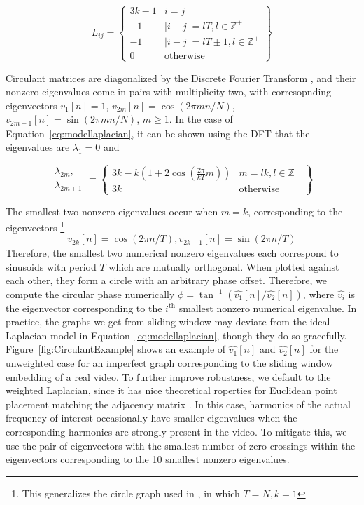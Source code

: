 \documentclass{article}
\begin{document}
\begin{equation}
\label{eq:modellaplacian}
L_{ij} = \left\{ \begin{array}{cc} 3k-1 & i = j \\ -1 & |i-j| = lT, l \in \mathbb{Z}^+ \\ -1 & |i-j| = lT \pm 1, l \in \mathbb{Z}^+ \\ 0 & \text{otherwise} \end{array} \right\}
\end{equation}

Circulant matrices are diagonalized by the Discrete Fourier Transform \cite{godsil2013algebraic}, and their nonzero eigenvalues come in pairs with multiplicity two, with corresopnding eigenvectors $v_1[n] = 1$, $v_{2m}[n] = \cos(2 \pi mn / N)$, $v_{2m+1}[n] = \sin(2 \pi m n / N)$, $m \geq 1$.  In the case of Equation~\ref{eq:modellaplacian}, it can be shown using the DFT that the eigenvalues are $\lambda_1 = 0$ and 

\begin{equation}
\begin{array}{cc}\lambda_{2m},\\\lambda_{2m+1}\end{array} = \left\{ \begin{array}{cc} 3k - k\left( 1 + 2 \cos \left( \frac{2 \pi}{kT} m \right) \right) & m = lk, l \in \mathbb{Z}^+ \\ 3k & \text{otherwise}  \end{array} \right\} 
\end{equation}

The smallest two nonzero eigenvalues occur when $m = k$, corresponding to the eigenvectors \footnote{This generalizes the circle graph used in \cite{averbuch2015ringit}, in which $T = N, k = 1$} 
\begin{equation}
v_{2k}[n] = \cos(2 \pi n / T), v_{2k+1}[n] = \sin(2 \pi n / T)
\end{equation}
Therefore, the smallest two numerical nonzero eigenvalues each correspond to sinusoids with period $T$ which are mutually orthogonal.  When plotted against each other, they form a circle with an arbitrary phase offset.  Therefore, we compute the circular phase numerically $\phi = \tan^{-1}(\hat{v_1}[n] / \hat{v_2}[n])$, where $\hat{v_i}$ is the eigenvector corresponding to the $i^\text{th}$ smallest nonzero numerical eigenvalue.  In practice, the graphs we get from sliding window may deviate from the ideal Laplacian model in Equation~\ref{eq:modellaplacian}, though they do so gracefully.  Figure~\ref{fig:CirculantExample} shows an example of $\hat{v_1}[n]$ and $\hat{v_2}[n]$ for the unweighted case for an imperfect graph corresponding to the sliding window embedding of a real video.  To further improve robustness, we default to the weighted Laplacian, since it has nice theoretical roperties for Euclidean point placement matching the adjacency matrix \cite{hall1970r}.  In this case, harmonics of the actual frequency of interest occasionally have smaller eigenvalues when the corresponding harmonics are strongly present in the video.  To mitigate this, we use the pair of eigenvectors with the smallest number of zero crossings within the eigenvectors corresponding to the 10 smallest nonzero eigenvalues.
\end{document}
